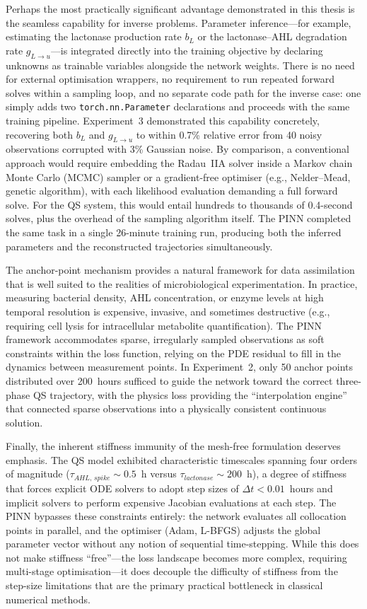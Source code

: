\documentclass[14pt,a4paper,openany]{extbook}
\begin{document}
Perhaps the most practically significant advantage demonstrated in this thesis is the seamless capability for inverse problems. Parameter inference---for example, estimating the lactonase production rate $b_L$ or the lactonase--AHL degradation rate $g_{L \to u}$---is integrated directly into the training objective by declaring unknowns as trainable variables alongside the network weights. There is no need for external optimisation wrappers, no requirement to run repeated forward solves within a sampling loop, and no separate code path for the inverse case: one simply adds two \texttt{torch.nn.Parameter} declarations and proceeds with the same training pipeline. Experiment~3 demonstrated this capability concretely, recovering both $b_L$ and $g_{L \to u}$ to within 0.7\% relative error from 40 noisy observations corrupted with 3\% Gaussian noise. By comparison, a conventional approach would require embedding the Radau~IIA solver inside a Markov chain Monte Carlo (MCMC) sampler or a gradient-free optimiser (e.g., Nelder--Mead, genetic algorithm), with each likelihood evaluation demanding a full forward solve. For the QS system, this would entail hundreds to thousands of 0.4-second solves, plus the overhead of the sampling algorithm itself. The PINN completed the same task in a single 26-minute training run, producing both the inferred parameters and the reconstructed trajectories simultaneously.

The anchor-point mechanism provides a natural framework for data assimilation that is well suited to the realities of microbiological experimentation. In practice, measuring bacterial density, AHL concentration, or enzyme levels at high temporal resolution is expensive, invasive, and sometimes destructive (e.g., requiring cell lysis for intracellular metabolite quantification). The PINN framework accommodates sparse, irregularly sampled observations as soft constraints within the loss function, relying on the PDE residual to fill in the dynamics between measurement points. In Experiment~2, only 50 anchor points distributed over 200~hours sufficed to guide the network toward the correct three-phase QS trajectory, with the physics loss providing the ``interpolation engine'' that connected sparse observations into a physically consistent continuous solution.

Finally, the inherent stiffness immunity of the mesh-free formulation deserves emphasis. The QS model exhibited characteristic timescales spanning four orders of magnitude ($\tau_{AHL,\,spike} \sim 0.5$~h versus $\tau_{lactonase} \sim 200$~h), a degree of stiffness that forces explicit ODE solvers to adopt step sizes of $\Delta t < 0.01$~hours and implicit solvers to perform expensive Jacobian evaluations at each step. The PINN bypasses these constraints entirely: the network evaluates all collocation points in parallel, and the optimiser (Adam, L-BFGS) adjusts the global parameter vector without any notion of sequential time-stepping. While this does not make stiffness ``free''---the loss landscape becomes more complex, requiring multi-stage optimisation---it does decouple the difficulty of stiffness from the step-size limitations that are the primary practical bottleneck in classical numerical methods.
\end{document}
